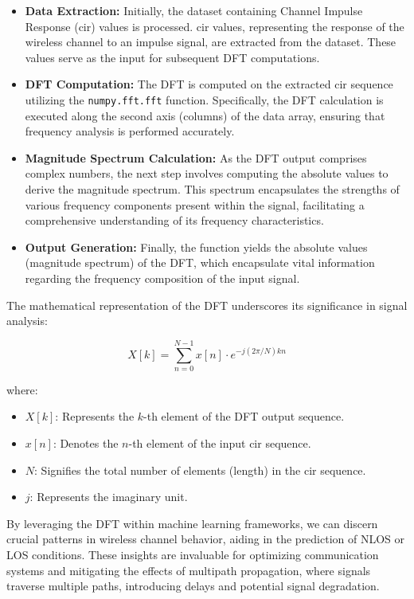 \begin{itemize}
    \item \textbf{Data Extraction:} Initially, the dataset containing Channel Impulse Response (\gls{cir}) values is processed. \gls{cir} values, representing the response of the wireless channel to an impulse signal, are extracted from the dataset. These values serve as the input for subsequent DFT computations.
    
    \item \textbf{DFT Computation:} The DFT is computed on the extracted \gls{cir} sequence utilizing the \texttt{numpy.fft.fft} function. Specifically, the DFT calculation is executed along the second axis (columns) of the data array, ensuring that frequency analysis is performed accurately.
    
    \item \textbf{Magnitude Spectrum Calculation:} As the DFT output comprises complex numbers, the next step involves computing the absolute values to derive the magnitude spectrum. This spectrum encapsulates the strengths of various frequency components present within the signal, facilitating a comprehensive understanding of its frequency characteristics.
    
    \item \textbf{Output Generation:} Finally, the function yields the absolute values (magnitude spectrum) of the DFT, which encapsulate vital information regarding the frequency composition of the input signal.
\end{itemize}

The mathematical representation of the DFT underscores its significance in signal analysis:

\begin{equation}
X[k] = \sum_{n=0}^{N-1} x[n] \cdot e^{-j(2\pi/N)kn}
\end{equation}

where:
\begin{itemize}
    \item $X[k]$: Represents the $k$-th element of the DFT output sequence.
    \item $x[n]$: Denotes the $n$-th element of the input \gls{cir} sequence.
    \item $N$: Signifies the total number of elements (length) in the \gls{cir} sequence.
    \item $j$: Represents the imaginary unit.
\end{itemize}

By leveraging the DFT within machine learning frameworks, we can discern crucial patterns in wireless channel behavior, aiding in the prediction of NLOS or LOS conditions. These insights are invaluable for optimizing communication systems and mitigating the effects of multipath propagation, where signals traverse multiple paths, introducing delays and potential signal degradation.

